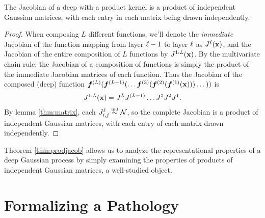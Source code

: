 \begin{theorem}
\label{thm:prodjacob}
The Jacobian of a deep \gp{} with a product kernel is a product of independent Gaussian matrices, with each entry in each matrix being drawn independently.
\end{theorem}
%
\begin{proof}
When composing $L$ different functions, we'll denote the \emph{immediate} Jacobian of the function mapping from layer $\ell -1$ to layer $\ell$ as $J^{\ell}({\bf{x}})$, and the Jacobian of the entire composition of $L$ functions by $J^{1:L}({\bf{x}})$.
%
By the multivariate chain rule, the Jacobian of a composition of functions is simply the product of the immediate Jacobian matrices of each function.  
%
Thus the Jacobian of the composed (deep) function $\boldsymbol{f}^{(L)}(\boldsymbol{f}^{(L-1)}(\dots \boldsymbol{f}^{(3)}( \boldsymbol{f}^{(2)}( \boldsymbol{f}^{(1)}({\bf{x}})))\dots))$ is
%
%
\begin{align}
 J^{1:L}({\bf{x}}) 
= J^L J^{(L-1)} \dots J^3 J^2 J^1. 
\end{align}
%
By lemma \ref{thm:matrix}, each ${J^\ell_{i,j} \overset{\mbox{\tiny \textnormal{ind}}}{\sim} \mathcal{N}}$, so the complete Jacobian is a product of independent Gaussian matrices, with each entry of each matrix drawn independently.
\end{proof}

\vspace{-0.1in}
Theorem \ref{thm:prodjacob} allows us to analyze the representational properties of a deep Gaussian process by simply examining the properties of products of independent Gaussian matrices, a well-studied object.






\section{Formalizing a Pathology}
\label{sec:formalizing-pathology}

